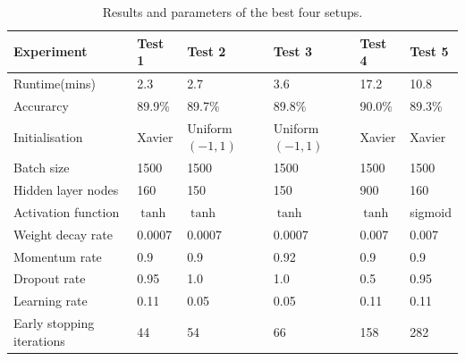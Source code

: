 \begin{table}
\caption{Results and parameters of the best four setups.}
\label{table:best-four-steps}
{\footnotesize
\centering
\begin{tabular}{@{}llllll@{}}
\toprule
Experiment                & Test 1  & Test 2           & Test 3           & Test 4  & Test 5  \\ \midrule
Runtime(mins)             & 2.3     & 2.7              & 3.6              & 17.2    & 10.8    \\
Accurarcy                 & 89.9\%  & 89.7\%           & 89.8\%           & 90.0\%  & 89.3\%  \\
Initialisation            & Xavier  & Uniform$(-1,1)$ & Uniform$(-1,1)$ & Xavier  & Xavier  \\
Batch size                & 1500    & 1500             & 1500             & 1500    & 1500    \\
Hidden layer nodes        & 160     & 150              & 150              & 900     & 160     \\
Activation function       & $\tanh$ & $\tanh$          & $\tanh$          & $\tanh$ & sigmoid \\
Weight decay rate         & 0.0007  & 0.0007           & 0.0007           & 0.007   & 0.007   \\
Momentum rate             & 0.9     & 0.9              & 0.92             & 0.9     & 0.9     \\
Dropout rate              & 0.95    & 1.0              & 1.0              & 0.5     & 0.95    \\
Learning rate             & 0.11    & 0.05             & 0.05             & 0.11    & 0.11    \\
Early stopping iterations & 44      & 54               & 66               & 158     & 282     \\ \bottomrule
\end{tabular}
}
\end{table}

